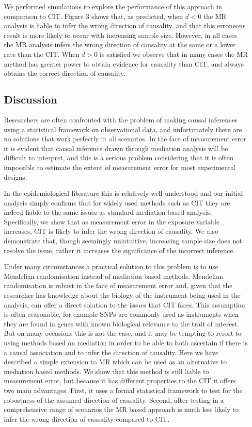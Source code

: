 \documentclass[]{article}
\begin{document}
We performed simulations to explore the performance of this approach in
comparison to CIT. Figure 3 shows that, as predicted, when \(d < 0\) the
MR analysis is liable to infer the wrong direction of causality, and
that this erroneous result is more likely to occur with increasing
sample size. However, in all cases the MR analysis infers the wrong
direction of causality at the same or a lower rate than the CIT. When
\(d > 0\) is satisfied we observe that in many cases the MR method has
greater power to obtain evidence for causality than CIT, and always
obtains the correct direction of causality.

\subsection{Discussion}\label{discussion}

Researchers are often confronted with the problem of making causal
inferences using a statistical framework on observational data, and
unfortunately there are no solutions that work perfectly in all
scenarios. In the face of measurement error it is evident that causal
inference drawn through mediation analysis will be difficult to
interpret, and this is a serious problem considering that it is often
impossible to estimate the extent of measurement error for most
experimental designs.

In the epidemiological literature this is relatively well understood and
our initial analysis simply confirms that for widely used methods such
as CIT they are indeed liable to the same issues as standard mediation
based analysis. Specifically, we show that as measurement error in the
exposure variable increases, CIT is likely to infer the wrong direction
of causality. We also demonstrate that, though seemingly unintuitive,
increasing sample size does not resolve the issue, rather it increases
the significance of the incorrect inference.

Under many circumstances a practical solution to this problem is to use
Mendelian randomisation instead of mediation based methods. Mendelian
randomisation is robust in the face of measurement error and, given that
the researcher has knowledge about the biology of the instrument being
used in the analysis, can offer a direct solution to the issues that CIT
faces. This assumption is often reasonable, for example SNPs are
commonly used as instruments when they are found in genes with known
biological relevance to the trait of interest. But on many occasions
this is not the case, and it may be tempting to resort to using methods
based on mediation in order to be able to both ascertain if there is a
causal association and to infer the direction of causality. Here we have
described a simple extension to MR which can be used as an alternative
to mediation based methods. We show that this method is still liable to
measurement error, but because it has different properties to the CIT it
offers two main advantages. First, it uses a formal statistical
framework to test for the robostness of the assumed direction of
causality. Second, after testing in a comprehensive range of scenarios
the MR based approach is much less likely to infer the wrong direction
of causality compared to CIT.
\end{document}
